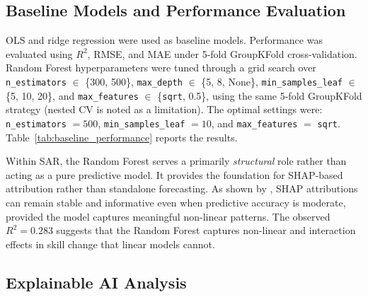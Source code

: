 \documentclass[3p,twocolumn,authoryear]{elsarticle}
\begin{document}
\subsection{Baseline Models and Performance Evaluation}

OLS and ridge regression were used as baseline models. Performance was evaluated
using $R^{2}$, RMSE, and MAE under 5-fold GroupKFold cross-validation. Random
Forest hyperparameters were tuned through a grid search over
\texttt{n\_estimators} $\in$ \{300, 500\},
\texttt{max\_depth} $\in$ \{5, 8, None\},
\texttt{min\_samples\_leaf} $\in$ \{5, 10, 20\}, and
\texttt{max\_features} $\in$ \{\texttt{sqrt}, 0.5\}, using the same 5-fold
GroupKFold strategy (nested CV is noted as a limitation). The optimal settings
were: \texttt{n\_estimators} $= 500$,
\texttt{min\_samples\_leaf} $= 10$, and
\texttt{max\_features} $=$ \texttt{sqrt}.
Table~\ref{tab:baseline_performance} reports the results.

\begin{table}[htbp]
\centering
\caption{Model performance across 5 folds ($n = 833$). Values show standard deviations.}
\label{tab:baseline_performance}
\end{table}

Within SAR, the Random Forest serves a primarily \textit{structural} role rather
than acting as a pure predictive model. It provides the foundation for
SHAP-based attribution rather than standalone forecasting. As shown by
\citet{lundberg2020}, SHAP attributions can remain stable and informative even
when predictive accuracy is moderate, provided the model captures meaningful
non-linear patterns. The observed $R^{2} = 0.283$ suggests that the Random
Forest captures non-linear and interaction effects in skill change that linear
models cannot.

\subsection{Explainable AI Analysis}
\end{document}
